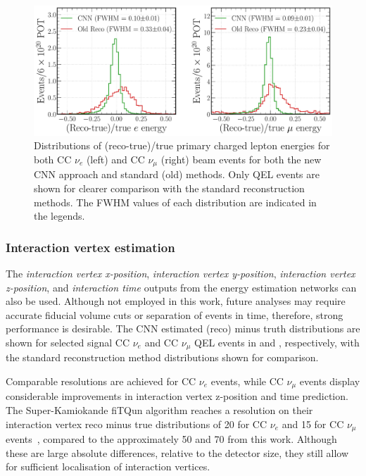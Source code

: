 \begin{figure} %
    \includegraphics[width=\textwidth]{diagrams/7-results/final_frac_e_comparison.pdf}
    \caption[Distributions of (reco-true)/true primary charged lepton energies for the CNN and
        standard methods] {Distributions of (reco-true)/true primary charged lepton energies for
        both CC $\nu_{e}$ (left) and CC $\nu_{\mu}$ (right) beam events for both the new CNN
        approach and standard (old) methods. Only QEL events are shown for clearer comparison with
        the standard reconstruction methods. The FWHM values of each distribution are indicated in
        the legends.}
    \label{fig:final_frac_e_comparison}
\end{figure}

\subsubsection*{Interaction vertex estimation} %

The \emph{interaction vertex x-position}, \emph{interaction vertex y-position}, \emph{interaction
    vertex z-position}, and \emph{interaction time} outputs from the energy estimation networks
    can also be used. Although not employed in this work, future analyses may require accurate
    fiducial volume cuts or separation of events in time, therefore, strong performance is
    desirable. The CNN estimated (reco) minus truth distributions are shown for selected signal CC
    $\nu_{e}$ and CC $\nu_{\mu}$ QEL events in 
    and , respectively, with the standard
    reconstruction method distributions shown for comparison.

Comparable resolutions are achieved for CC $\nu_{e}$ events, while CC $\nu_{\mu}$ events display
considerable improvements in interaction vertex z-position and time prediction. The
Super-Kamiokande fiTQun algorithm reaches a resolution on their interaction vertex reco minus true
distributions of \SI{20}{} for CC $\nu_{e}$ and \SI{15}{} for CC $\nu_{\mu}$
events~\cite{jiang2019}, compared to the approximately \SI{50}{} and \SI{70}{}
from this work. Although these are large absolute differences, relative to the detector size, they
still allow for sufficient localisation of interaction vertices.

